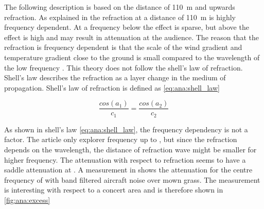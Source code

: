 

The following description is based on the distance of \SI{110}{\meter} and upwards refraction. As explained in \citep{review_of_sound} the refraction at a distance of \SI{110}{\meter} is highly frequency dependent. At a frequency below  the effect is sparse, but above the effect is high and may result in  attenuation at the audience. The reason that the refraction is frequency dependent is that the scale of the wind gradient and temperature gradient close to the ground is small compared to the wavelength of the low frequency \citep{review_of_sound}. This theory does not follow the shell's law of refraction. Shell's law describes the refraction as a layer change in the medium of propagation. Shell's law of refraction is defined as \autoref{eq:ana:shell_law}

\begin{equation}\label{eq:ana:shell_law}
\frac{cos(a_1)}{c_1} = \frac{cos(a_2)}{c_2}
\end{equation}

\startexplain
{}
\stopexplain

As shown in shell's law \autoref{eq:ana:shell_law}, the frequency dependency is not a factor. The article \citep{review_of_sound} only explorer frequency up to , but since the refraction depends on the wavelength, the distance of refraction wave might be smaller for higher frequency. The attenuation with respect to refraction seems to have a saddle attenuation at . A measurement in \citep{review_of_sound} shows the attenuation for the centre frequency of  with  band filtered aircraft noise over mown grass. The measurement is interesting with respect to a concert area and is therefore shown in \autoref{fig:ana:excess} 



